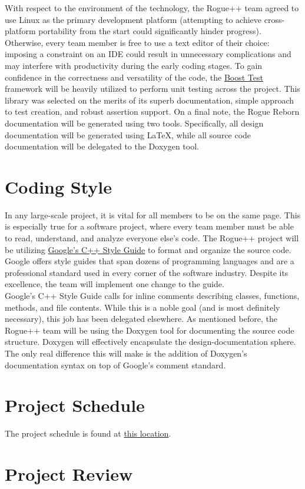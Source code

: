 \documentclass{article}
\begin{document}
With respect to the environment of the technology, the Rogue++ team agreed to use Linux as the primary development platform (attempting to achieve cross-platform portability from the start could significantly hinder progress).  Otherwise, every team member is free to use a text editor of their choice: imposing a constraint on an IDE could result in unnecessary complications and may interfere with productivity during the early coding stages.  To gain confidence in the correctness and versatility of the code, the \href{http://www.boost.org/doc/libs/1_54_0/libs/test/doc/html/index.html}{Boost Test} framework will be heavily utilized to perform unit testing across the project.  This library was selected on the merits of its superb documentation, simple approach to test creation, and robust assertion support.  On a final note, the Rogue Reborn documentation will be generated using two tools.  Specifically, all design documentation will be generated using LaTeX, while all source code documentation will be delegated to the Doxygen tool.

\section{Coding Style}
\label{style_label}

\indent
In any large-scale project, it is vital for all members to be on the same page.  This is especially true for a software project, where every team member must be able to read, understand, and analyze everyone else's code.  The Rogue++ project will be utilizing \href{https://google.github.io/styleguide/cppguide.html}{Google's C++ Style Guide} to format and organize the source code.  Google offers style guides that span dozens of programming languages and are a professional standard used in every corner of the software industry. Despite its excellence, the team will implement one change to the guide.\\

Google's C++ Style Guide calls for inline comments describing classes, functions, methods, and file contents.  While this is a noble goal (and is most definitely necessary), this job has been delegated elsewhere.  As mentioned before, the Rogue++ team will be using the Doxygen tool for documenting the source code structure.  Doxygen will effectively encapsulate the design-documentation sphere. The only real difference this will make is the addition of Doxygen's documentation syntax on top of Google's comment standard.

\section{Project Schedule}
\label{schedule_label}

\indent
The project schedule is found at \href{run:../../ProjectSchedule/Rogue.gan}{this location}.

\section{Project Review}
\end{document}
